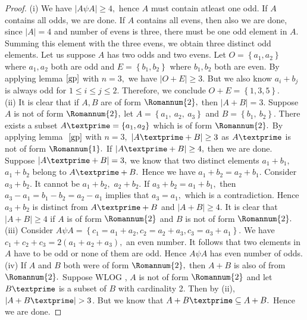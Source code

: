 \documentclass[reqno,10pt]{amsart}
\newcommand{\one}{ \Romannum {1}}
\newcommand{\two}{\Romannum {2}}
\begin{document}
\begin{proof}
(i) We have $|A \psi A| \geq 4, $ hence $A$ must contain atleast one odd. If $A$ contains all odds, we are done. If $A$ contains all evens, then also we are done, since $|A|=4$ and number of evens is three, there must be one odd element in $A.$ Summing this element with the three evens, we obtain three distinct odd elements. Let us suppose $A$ has two odds and two evens. Let $ O = \left\lbrace a_1,a_2 \right\rbrace $ where $a_1,a_2$ both are odd and  $E = \left\lbrace b_1,b_2 \right\rbrace $ where $b_1,b_2$ both are even.  By applying lemma$~\ref{gp}$ with $n=3,$ we have $ |O+E|  \geq 3.$ But we also know $a_i+b_j$ is always odd for $1 \leq i \leq j \leq 2$. Therefore, we conclude $ O+E =  \left\lbrace 1,3,5 \right\rbrace .$ 
\\
(ii)
It is clear that if $A, B$ are of form $\Romannum{2},$ then $|A+B| = 3.$ Suppose $A$ is not of form $\Romannum{2},$ let
$ A =\left\lbrace a_1, \ a_2, \ a_3 \right\rbrace $ and $  B=\left\lbrace b_1, \ b_2 \right\rbrace.$ There exists a subset 
$A\textprime =\left\lbrace a_1,a_2\right\rbrace$ which is of form $\Romannum{2}.$ By applying lemma $~\ref{gp}$ with $n=3,$  
$|A\textprime + B| \geq 3$ as $A\textprime$ is not of form $\one.$  If $|A\textprime + B| \geq 4,$ then we are done. Suppose $|A\textprime + B|=3,$ we know that two distinct elements $a_1+b_1,$  $a_1+b_2$ belong to $A\textprime + B.$  Hence we have $a_1 + b_2 = a_2 +b_1.$  Consider $a_3+b_2.$  It cannot be $a_1+b_2,$ $a_2+b_2.$ If $a_3 + b_2 = a_1 +b_1,$ then 
$a_3-a_1=b_1-b_2=a_2-a_1$ implies that $a_3 = a_1,$ which is a contradiction. Hence $a_3+b_2$ is distinct from $A\textprime+B$  and $|A + B| \geq 4.$ It is clear that $|A + B| \geq 4$ if $A$ is of form $\two$ and $B$ is not of form $\two.$
\\
(iii)  Consider $ A \psi A =  \left\lbrace c_1= a_1+a_2,c_2 = a_2+a_3 ,c_3 =a_3+a_1 \right\rbrace. $ We have $c_1+c_2+c_3 = 2(a_1+a_2+a_3),$ an even number. It follows that two elements in $A$ have to be odd or none of them are odd. Hence $A \psi A$ has even number of odds.\\
(iv) If $A$ and $B$ both were of form $\two,$ then $A+B$ is also of from $\two.$ Suppose WLOG , $A$ is not of form $\two$ and let $B\textprime$ is a subset of $B$ with cardinality 2. Then by (ii),
 $|A+B\textprime| > 3$. But we know that $A+B\textprime \subseteq A+B.$ Hence we are done.
 \end{proof}
\end{document}

